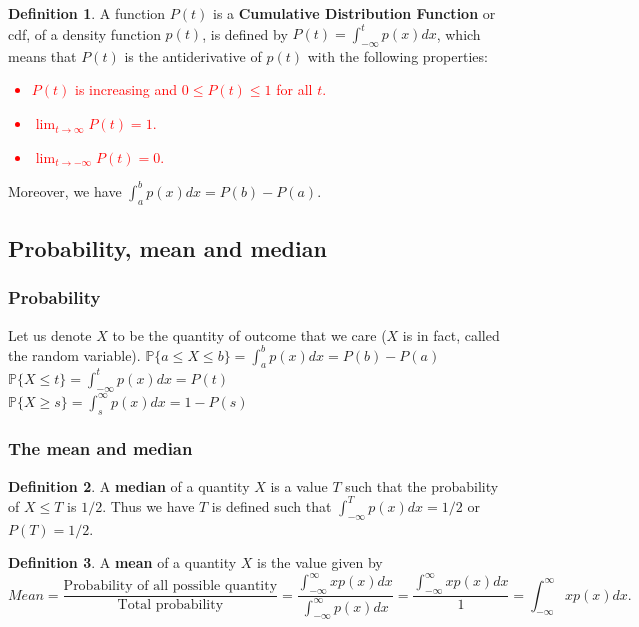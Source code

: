 \documentclass[12pt]{article}
\theoremstyle{definition}
\theoremstyle{definition}
\newtheorem{definition}{Definition}[section]
\theoremstyle{remark}
\theoremstyle{definition}
\theoremstyle{definition}
\theoremstyle{definition}
\begin{document}
\begin{definition}
A function $P(t)$ is a \textbf{Cumulative Distribution Function} or cdf, of a density function $p(t)$, is defined by 
$P(t) =\int_{-\infty}^t p(x) dx $,
which means that $P(t)$ is the antiderivative of $p(t)$ with the following properties:
\textcolor{red}{\begin{itemize}
\item $P(t)$ is increasing and $0\leq P(t)\leq 1$ for all $t$.
\item $\lim_{t \to \infty}P(t)=1.$
\item $\lim_{t \to -\infty}P(t)=0.$
\end{itemize}}
\end{definition}

Moreover, we have $\int_a^b p(x)dx=P(b)-P(a)$.

\subsection{Probability, mean and median}

\subsubsection*{Probability}
Let us denote $X$ to be the quantity of outcome that we care ($X$ is in fact, called the random variable).
$\mathbb{P}\{a\leq X\leq b\}=\int_a^b p(x)dx=P(b)-P(a)$\\
$\mathbb{P}\{X\leq t\}=\int_{-\infty}^t p(x)dx=P(t)$\\
$\mathbb{P}\{X\geq s\}=\int_{s}^\infty p(x)dx=1-P(s)$

\subsubsection*{The mean and median}
\begin{definition}
A \textbf{median} of a quantity $X$ is a value $T$ such that the probability of $X\leq T$ is $1/2$. Thus we have  $T$ is defined such that
$\int_{-\infty}^T p(x) dx=1/2$  or $P(T)=1/2$.
\end{definition}
\begin{definition} A \textbf{mean} of a quantity $X$ is the value given by
	\[ Mean= \frac{\text{Probability of all possible quantity}}{\text{Total probability}}= \frac{\int_{-\infty}^{\infty}xp(x)dx}{\int_{-\infty}^{\infty}p(x)dx}=\frac{\int_{-\infty}^{\infty}xp(x)dx}{1}=\int_{-\infty}^{\infty}xp(x)dx. \]
\end{definition}
\end{document}
